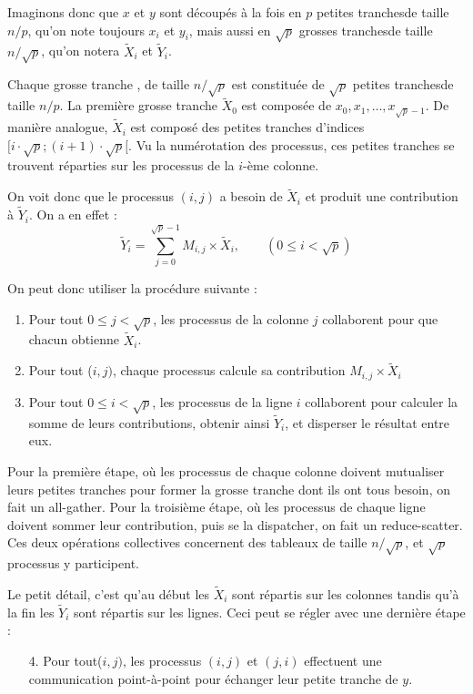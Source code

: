 Imaginons donc que $x$ et $y$ sont découpés à la fois en $p$ \og
petites tranches\fg de taille $n/p$, qu'on note toujours $x_i$ et
$y_i$, mais aussi en $\sqrt{p}$ \og grosses tranches\fg de taille
$n/\sqrt{p}$, qu'on notera $\widetilde{X}_i$ et $\widetilde{Y}_i$.

Chaque \og grosse tranche \og, de taille $n/\sqrt{p}$ est constituée de
$\sqrt{p}$ \og petites tranches\fg de taille $n/p$. La première grosse tranche
$\widetilde{X}_0$ est composée de $x_0, x_1, \dots, x_{\sqrt{p}-1}$. De manière
analogue, $\widetilde{X}_i$ est composé des petites tranches d'indices
$[i\cdot \sqrt{p}; (i+1)\cdot \sqrt{p}[$. Vu la numérotation des processus, ces
petites tranches se trouvent réparties sur les processus de la $i$-ème colonne.

On voit donc que le processus $(i,j)$ a besoin de $\widetilde{X}_i$ et produit une
contribution à $\widetilde{Y}_i$. On a en effet :
\[
\widetilde{Y}_i = \sum_{j=0}^{\sqrt{p}-1}  M_{i,j} \times \widetilde{X}_i,
\qquad (0 \leq i < \sqrt{p})
\]

On peut donc utiliser la procédure suivante :
\begin{enumerate}
\item Pour tout $0 \leq j < \sqrt{p}$, les processus de la colonne $j$
  collaborent pour que chacun obtienne $\widetilde{X}_i$.

\item Pour tout ($i,j)$, chaque processus calcule sa contribution
  $M_{i,j} \times \widetilde{X}_i$

\item Pour tout $0 \leq i < \sqrt{p}$, les processus de la ligne $i$
  collaborent pour calculer la somme de leurs contributions, obtenir
  ainsi $\widetilde{Y}_i$, et disperser le résultat entre eux.
\end{enumerate}

\medskip

Pour la première étape, où les processus de chaque colonne doivent mutualiser
leurs petites tranches pour former la grosse tranche dont ils ont tous besoin,
on fait un \og all-gather\fg. Pour la troisième étape, où les processus de
chaque ligne doivent sommer leur contribution, puis se la dispatcher, on fait un
\og reduce-scatter\fg. Ces deux opérations collectives concernent des tableaux
de taille $n/\sqrt{p}$, et $\sqrt{p}$ processus y participent.

Le petit détail, c'est qu'au début les $\widetilde{X}_i$ sont répartis
sur les colonnes tandis qu'à la fin les $\widetilde{Y}_i$ sont
répartis sur les lignes. Ceci peut se régler avec une dernière étape :
\begin{enumerate}
\item[4.] Pour tout($i,j)$, les processus $(i,j)$ et $(j,i)$ effectuent une
  communication point-à-point pour échanger leur petite tranche de $y$.
\end{enumerate}

